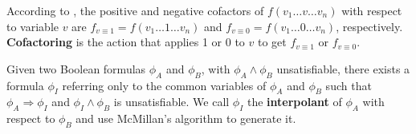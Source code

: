 \documentclass[runningheads,a4paper]{llncs}
\begin{document}

According to \cite{EFFSATUSMCCO},
the positive and negative cofactors of $f(v_1\dots v\dots v_n)$ with respect to variable
$v$ are $f_{v\equiv 1}=f(v_1\dots 1\dots v_n)$ and $f_{v\equiv 0}=f(v_1\dots 0\dots v_n)$,
respectively.
\textbf{Cofactoring} is the action that applies 1 or 0 to $v$ to get $f_{v\equiv 1}$ or $f_{v\equiv 0}$.

Given two Boolean formulas $\phi_A$ and $\phi_B$,
with $\phi_A\wedge \phi_B$ unsatisfiable,
there exists a formula $\phi_I$ referring only
to the common variables of $\phi_A$ and $\phi_B$ such that $\phi_A\Rightarrow \phi_I$
and $\phi_I\wedge \phi_B$ is unsatisfiable.
We call $\phi_I$ the \textbf{interpolant} \cite{Craig} of $\phi_A$ with respect to $\phi_B$
and use McMillan's algorithm \cite{interp_McMillan} to generate it.



\end{document}
